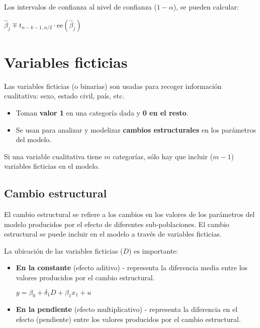 \documentclass[10pt, a4paper, landscape]{article}
\newcommand{\se}{\mathrm{ee}}
\begin{document}
\begin{multicols}{3}
		Los intervalos de confianza al nivel de confianza ($1 - \alpha$), se pueden calcular:
		
		\begin{center}
			$\hat{\beta}_{j} \mp t_{n - k - 1, \alpha/2} \cdot \se(\hat{\beta}_{j})$
		\end{center}
		
		\columnbreak
		
		\section*{Variables ficticias}
		
		Las variables ficticias (o binarias) son usadas para recoger información cualitativa: sexo, estado civil, país, etc.
		
		\begin{itemize}[leftmargin=*]
			\item Toman \textbf{valor 1} en una categoría dada y \textbf{0 en el resto}.
			\item Se usan para analizar y modelizar \textbf{cambios estructurales} en los parámetros del modelo.
		\end{itemize}
		
		Si una variable cualitativa tiene $m$ categorías, sólo hay que incluir ($m - 1$) variables ficticias en el modelo.
		
		\subsection*{Cambio estructural}
		
		El cambio estructural se refiere a los cambios en los valores de los parámetros del modelo producidos por el efecto de diferentes sub-poblaciones. El cambio estructural se puede incluir en el modelo a través de variables ficticias.
		
		La ubicación de las variables ficticias ($D$) es importante:
		
		\begin{itemize}[leftmargin=*]
			\item \textbf{En la constante} (efecto aditivo) - representa la diferencia media entre los valores producidos por el cambio estructural.
			
			\begin{center}
				$y = \beta_{0} + \delta_{1} D + \beta_{1} x_{1} + u$
			\end{center}
			
			\item \textbf{En la pendiente} (efecto multiplicativo) - representa la diferencia en el efecto (pendiente) entre los valores producidos por el cambio estructural.
			

\end{itemize}
\end{multicols}
\end{document}
